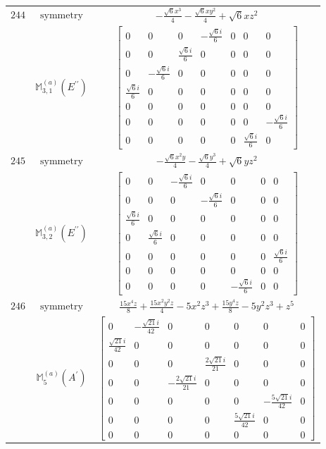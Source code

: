 \documentclass[fleqn,8pt,landscape]{jsarticle}
\begin{document}
\begin{longtable}{ccc}
$ 244 $ & $ \text{symmetry} $ & $ - \frac{\sqrt{6} x^{3}}{4} - \frac{\sqrt{6} x y^{2}}{4} + \sqrt{6} x z^{2} $ \\
$  $ & $ \mathbb{M}_{3,1}^{(a)}(E^{\prime\prime}) $ & $ \begin{bmatrix} 0 & 0 & 0 & - \frac{\sqrt{6} i}{6} & 0 & 0 & 0 \\ 0 & 0 & \frac{\sqrt{6} i}{6} & 0 & 0 & 0 & 0 \\ 0 & - \frac{\sqrt{6} i}{6} & 0 & 0 & 0 & 0 & 0 \\ \frac{\sqrt{6} i}{6} & 0 & 0 & 0 & 0 & 0 & 0 \\ 0 & 0 & 0 & 0 & 0 & 0 & 0 \\ 0 & 0 & 0 & 0 & 0 & 0 & - \frac{\sqrt{6} i}{6} \\ 0 & 0 & 0 & 0 & 0 & \frac{\sqrt{6} i}{6} & 0 \end{bmatrix} $ \\ \hline
$ 245 $ & $ \text{symmetry} $ & $ - \frac{\sqrt{6} x^{2} y}{4} - \frac{\sqrt{6} y^{3}}{4} + \sqrt{6} y z^{2} $ \\
$  $ & $ \mathbb{M}_{3,2}^{(a)}(E^{\prime\prime}) $ & $ \begin{bmatrix} 0 & 0 & - \frac{\sqrt{6} i}{6} & 0 & 0 & 0 & 0 \\ 0 & 0 & 0 & - \frac{\sqrt{6} i}{6} & 0 & 0 & 0 \\ \frac{\sqrt{6} i}{6} & 0 & 0 & 0 & 0 & 0 & 0 \\ 0 & \frac{\sqrt{6} i}{6} & 0 & 0 & 0 & 0 & 0 \\ 0 & 0 & 0 & 0 & 0 & 0 & \frac{\sqrt{6} i}{6} \\ 0 & 0 & 0 & 0 & 0 & 0 & 0 \\ 0 & 0 & 0 & 0 & - \frac{\sqrt{6} i}{6} & 0 & 0 \end{bmatrix} $ \\ \hline
$ 246 $ & $ \text{symmetry} $ & $ \frac{15 x^{4} z}{8} + \frac{15 x^{2} y^{2} z}{4} - 5 x^{2} z^{3} + \frac{15 y^{4} z}{8} - 5 y^{2} z^{3} + z^{5} $ \\
$  $ & $ \mathbb{M}_{5}^{(a)}(A^{\prime}) $ & $ \begin{bmatrix} 0 & - \frac{\sqrt{21} i}{42} & 0 & 0 & 0 & 0 & 0 \\ \frac{\sqrt{21} i}{42} & 0 & 0 & 0 & 0 & 0 & 0 \\ 0 & 0 & 0 & \frac{2 \sqrt{21} i}{21} & 0 & 0 & 0 \\ 0 & 0 & - \frac{2 \sqrt{21} i}{21} & 0 & 0 & 0 & 0 \\ 0 & 0 & 0 & 0 & 0 & - \frac{5 \sqrt{21} i}{42} & 0 \\ 0 & 0 & 0 & 0 & \frac{5 \sqrt{21} i}{42} & 0 & 0 \\ 0 & 0 & 0 & 0 & 0 & 0 & 0 \end{bmatrix} $ \\ \hline

\end{longtable}
\end{document}
